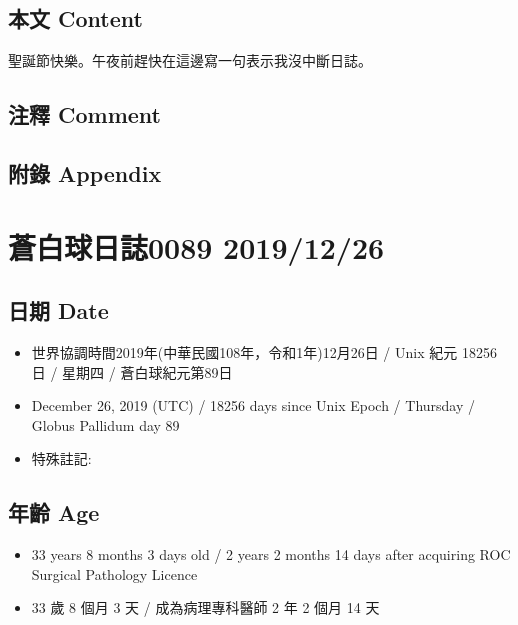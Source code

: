 \documentclass[a5paper, 12pt
]{book}
\providecommand{\tightlist}{%
  \setlength{\itemsep}{0pt}\setlength{\parskip}{0pt}}
\begin{document}
\hypertarget{ux672cux6587-content-24}{%
\subsection{本文 Content}\label{ux672cux6587-content-24}}

聖誕節快樂。午夜前趕快在這邊寫一句表示我沒中斷日誌。

\hypertarget{ux6ce8ux91cb-comment-23}{%
\subsection{注釋 Comment}\label{ux6ce8ux91cb-comment-23}}

\hypertarget{ux9644ux9304-appendix-24}{%
\subsection{附錄 Appendix}\label{ux9644ux9304-appendix-24}}

\hypertarget{ux84bcux767dux7403ux65e5ux8a8c0089-20191226}{%
\section{蒼白球日誌0089
2019/12/26}\label{ux84bcux767dux7403ux65e5ux8a8c0089-20191226}}

\hypertarget{ux65e5ux671f-date-25}{%
\subsection{日期 Date}\label{ux65e5ux671f-date-25}}

\begin{itemize}
\tightlist
\item
  世界協調時間2019年(中華民國108年，令和1年)12月26日 / Unix 紀元 18256
  日 / 星期四 / 蒼白球紀元第89日
\item
  December 26, 2019 (UTC) / 18256 days since Unix Epoch / Thursday /
  Globus Pallidum day 89
\item
  特殊註記:
\end{itemize}

\hypertarget{ux5e74ux9f61-age-25}{%
\subsection{年齡 Age}\label{ux5e74ux9f61-age-25}}

\begin{itemize}
\tightlist
\item
  33 years 8 months 3 days old / 2 years 2 months 14 days after
  acquiring ROC Surgical Pathology Licence
\item
  33 歲 8 個月 3 天 / 成為病理專科醫師 2 年 2 個月 14 天
\end{itemize}
\end{document}

